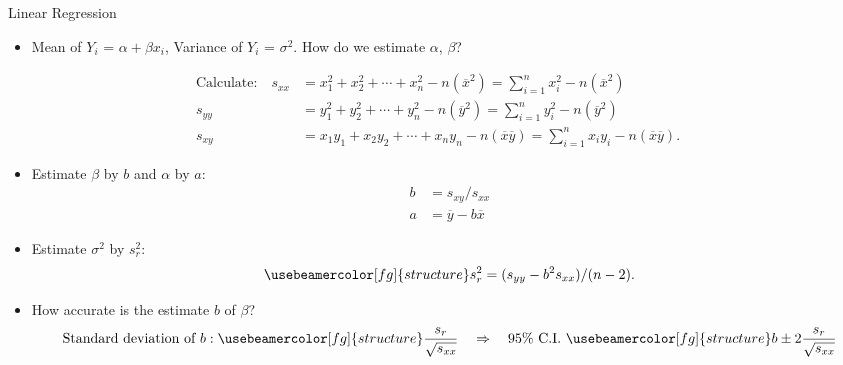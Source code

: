 \documentclass[10pt, handout, xcolor=table]{beamer}
\newcommand*\themecol{\usebeamercolor[fg]{structure}}
\begin{document}
\begin{frame}{Linear Regression}
\small
\begin{itemize}
\setlength{\itemsep}{6pt}
\item Mean of $Y_i$ = $\alpha + \beta x_i$, Variance of $Y_i$ = $\sigma^2$. How do we estimate $\alpha$, $\beta$?
\end{itemize}
\begin{align*}
\text{Calculate:} \quad s_{xx} &= x_1^2 + x_2^2 + \cdots + x_n^2 - n(\overline{x}^2) = \sum_{i=1}^n x_i^2 - n(\overline{x}^2)\\
s_{yy} &= y_1^2 + y_2^2 + \cdots + y_n^2 - n(\overline{y}^2) = \sum_{i=1}^n y_i^2 - n(\overline{y}^2) \\
s_{xy} &= x_1y_1 + x_2y_2 + \cdots + x_ny_n - n(\overline{x}\overline{y}) = \sum_{i=1}^n x_i y_i - n(\overline{x}\overline{y}).
\end{align*}
\vspace{-0.25cm}
\begin{itemize}
\setlength{\itemsep}{8pt}
\item Estimate $\beta$ by $b$ and $\alpha$ by $a$:
{\themecol \begin{align*}
 b &= s_{xy}/s_{xx}\\
a &= \overline{y} - b\overline{x}
\end{align*}}
\vspace{-0.5cm}
\item Estimate $\sigma^2$ by $s_r^2$:
$${\themecol s_r^2 = (s_{yy} - b^2 s_{xx})/(n-2).}$$
\item How accurate is the estimate $b$ of $\beta$?
$$\text{Standard deviation of }b:{ \themecol \frac{s_r}{\sqrt{s_{xx}}}} \quad \Rightarrow \quad 95\% \text{ C.I. }{\themecol b \pm 2\frac{s_r}{\sqrt{s_{xx}}}}$$
\end{itemize}
\end{frame}
\end{document}
